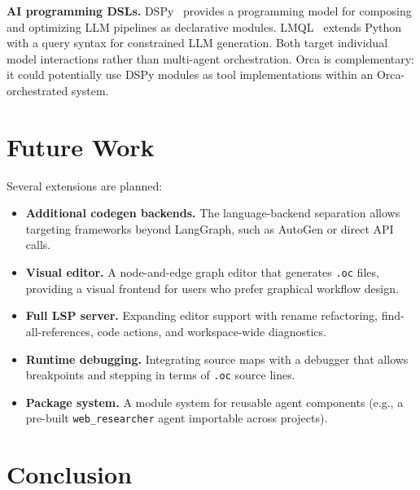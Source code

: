 \documentclass[sigconf,nonacm]{acmart}
\begin{document}
\noindent\textbf{AI programming DSLs.}
DSPy~\cite{dspy} provides a programming model for composing and optimizing
LLM pipelines as declarative modules. LMQL~\cite{lmql} extends Python with
a query syntax for constrained LLM generation. Both target individual
model interactions rather than multi-agent orchestration. Orca is
complementary: it could potentially use DSPy modules as tool
implementations within an Orca-orchestrated system.

\section{Future Work}
\label{sec:future}

Several extensions are planned:

\begin{itemize}[leftmargin=*]
  \item \textbf{Additional codegen backends.} The language-backend separation
        allows targeting frameworks beyond LangGraph, such as AutoGen or
        direct API calls.
  \item \textbf{Visual editor.} A node-and-edge graph editor that generates
        \texttt{.oc} files, providing a visual frontend for users who prefer
        graphical workflow design.
  \item \textbf{Full LSP server.} Expanding editor support with rename
        refactoring, find-all-references, code actions, and workspace-wide
        diagnostics.
  \item \textbf{Runtime debugging.} Integrating source maps with a debugger
        that allows breakpoints and stepping in terms of \texttt{.oc}
        source lines.
  \item \textbf{Package system.} A module system for reusable agent
        components (e.g., a pre-built \texttt{web\_researcher} agent
        importable across projects).
\end{itemize}

\section{Conclusion}
\label{sec:conclusion}
\end{document}
